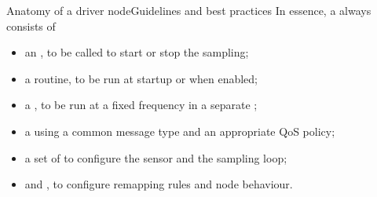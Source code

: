 \begin{frame}{Anatomy of a driver node}{Guidelines and best practices}
  \justifying
  In essence, a  always consists of
  \begin{itemize}
    \item an , to be called to start or stop the sampling;
    \item a  routine, to be run at startup or when enabled;
    \item a , to be run at a fixed frequency in a separate ;
    \item a  using a common message type and an appropriate QoS policy;
    \item a set of  to configure the sensor and the sampling loop;
    \item {} and , to configure remapping rules and node behaviour.
  \end{itemize}
\end{frame}
